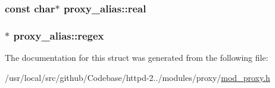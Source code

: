 \subsubsection[{\texorpdfstring{real}{real}}]{\setlength{\rightskip}{0pt plus 5cm}const char$\ast$ proxy\+\_\+alias\+::real}\hypertarget{structproxy__alias_a62e250f96fd9f5756c85c3df047282c7}{}\label{structproxy__alias_a62e250f96fd9f5756c85c3df047282c7}
\subsubsection[{\texorpdfstring{regex}{regex}}]{$\ast$ proxy\+\_\+alias\+::regex}\hypertarget{structproxy__alias_aed6c1229f88d2b5260bd257307f06585}{}\label{structproxy__alias_aed6c1229f88d2b5260bd257307f06585}


The documentation for this struct was generated from the following file\+:\begin{DoxyCompactItemize}
\item 
/usr/local/src/github/\+Codebase/httpd-\/2../modules/proxy/\hyperlink{mod__proxy_8h}{mod\+\_\+proxy.\+h}\end{DoxyCompactItemize}
